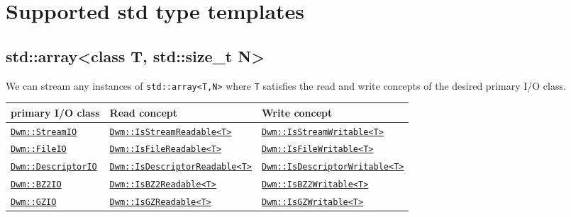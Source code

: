 \chapter{Supported {\ttfamily std} type templates}

\begin{minipage}{\textwidth}
\section{\ttfamily std::array<class T, std::size\_t N>}

We can stream any instances of \texttt{std::array<T,N>} where
\texttt{T} satisfies the read and write concepts of the desired
primary I/O class.
\vspace{1ex}

\begin{tabular}{lll}
  \textbf{primary I/O class} & \textbf{Read concept} & \textbf{Write concept} \\ \hline
  \hyperref[section:DwmStreamIOClass]{\texttt{Dwm::StreamIO}} & \hyperref[concept:DwmIsStreamReadable]{\texttt{Dwm::IsStreamReadable<T>}} & \hyperref[concept:DwmIsStreamWritable]{\texttt{Dwm::IsStreamWritable<T>}} \\
  \hyperref[section:DwmFileIOClass]{\texttt{Dwm::FileIO}} & \hyperref[concept:DwmIsFileReadable]{\texttt{Dwm::IsFileReadable<T>}} & \hyperref[concept:DwmIsFileWritable]{\texttt{Dwm::IsFileWritable<T>}} \\
  \hyperref[section:DwmDescriptorIOClass]{\texttt{Dwm::DescriptorIO}} & \hyperref[concept:DwmIsDescriptorReadable]{\texttt{Dwm::IsDescriptorReadable<T>}} & \hyperref[concept:DwmIsDescriptorWritable]{\texttt{Dwm::IsDescriptorWritable<T>}} \\
  \hyperref[section:DwmBZ2IOClass]{\texttt{Dwm::BZ2IO}} & \hyperref[concept:DwmIsBZ2Readable]{\texttt{Dwm::IsBZ2Readable<T>}} & \hyperref[concept:DwmIsBZ2Writable]{\texttt{Dwm::IsBZ2Writable<T>}} \\
  \hyperref[section:DwmGZIOClass]{\texttt{Dwm::GZIO}} & \hyperref[concept:DwmIsGZReadable]{\texttt{Dwm::IsGZReadable<T>}} & \hyperref[concept:DwmIsGZWritable]{\texttt{Dwm::IsGZWritable<T>}} \\
\end{tabular}
\end{minipage}

